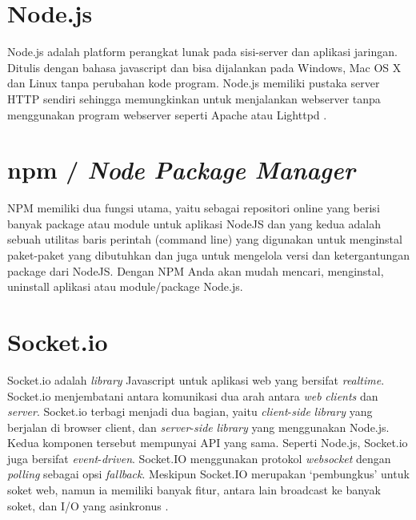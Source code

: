    \section{Node.js}
   Node.js adalah platform perangkat lunak pada sisi-server dan aplikasi jaringan. Ditulis dengan bahasa javascript dan bisa dijalankan pada Windows, Mac OS X dan Linux tanpa perubahan kode program. Node.js memiliki pustaka server HTTP sendiri sehingga memungkinkan untuk menjalankan webserver tanpa menggunakan program webserver seperti Apache atau Lighttpd \cite{noauthor_node.js_2014}.
   
   \section{npm / \textit{Node Package Manager}}
   NPM memiliki dua fungsi utama, yaitu sebagai repositori online yang berisi banyak package atau module untuk aplikasi NodeJS dan yang kedua adalah sebuah utilitas baris perintah (command line) yang digunakan untuk menginstal paket-paket yang dibutuhkan dan juga untuk mengelola versi dan ketergantungan package dari NodeJS. Dengan NPM Anda akan mudah mencari, menginstal, uninstall aplikasi atau module/package Node.js\cite{azurri_node_2016}.
   
   \section{Socket.io}
   Socket.io adalah \textit{library} Javascript untuk aplikasi web yang bersifat \textit{realtime}. Socket.io menjembatani antara komunikasi dua arah antara \textit{web} \textit{clients} dan \textit{server}. Socket.io terbagi menjadi dua bagian, yaitu \textit{client}-\textit{side} \textit{library} yang berjalan di browser client, dan \textit{server}-\textit{side} \textit{library} yang menggunakan Node.js. Kedua komponen tersebut mempunyai API yang sama. Seperti Node.js, Socket.io juga bersifat \textit{event}-\textit{driven}. Socket.IO menggunakan protokol \textit{websocket} dengan \textit{polling} sebagai opsi \textit{fallback}. Meskipun Socket.IO merupakan ‘pembungkus’ untuk soket web, namun ia memiliki banyak fitur, antara lain broadcast ke banyak soket, dan I/O yang asinkronus \cite{noauthor_socket.io_2016}.
         
   
